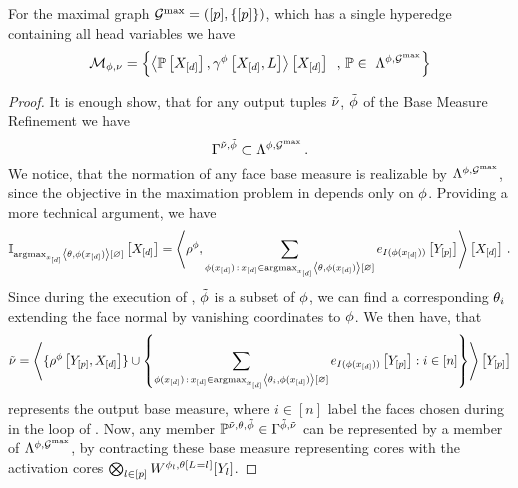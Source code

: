 \begin{theorem}
	For the maximal graph $\mathcal{G}^{\mathrm{max}}=([p],\{[p]\})$, which has a single hyperedge containing all head variables we have
	\begin{align*}
		\genmeanset = \left\{ \contractionof{\probat{\shortcatvariables},\sencodingofat{\sstat}{\shortcatvariables,\selvariable}}{\shortcatvariables} \, , \, \probtensor \in \realizabledistsof{\sstat,\maxgraph} \right\}
	\end{align*}
\end{theorem}
\begin{proof}
	It is enough show, that for any output tuples $\tilde{\nu}$, $\tilde{\phi}$ of the Base Measure Refinement  we have
		\[ \Gamma^{\tilde{\nu},\tilde{\phi}} \subset  \Lambda^{\phi,\mathcal{G}^{\mathrm{max}}} \, . \]
	We notice, that the normation of any face base measure is realizable by $\Lambda^{\phi,\mathcal{G}^{\mathrm{max}}}$, since the objective in the maximation problem in  depends only on $\phi$.
	Providing a more technical argument, we have
	\begin{align*}
		\mathbb{I}_{\mathrm{argmax}_{x_{[d]}} \left\langle \theta,\phi(x_{[d]})\right\rangle \left[ \varnothing \right]}\left[X_{[d]}\right]
		= \left\langle 
			\rho^{\phi},
			\sum_{\phi(x_{[d]}) \, : \, x_{[d]} \in \mathrm{argmax}_{x_{[d]}} \left\langle \theta,\phi(x_{[d]})\right\rangle \left[ \varnothing \right] }
			e_{I(\phi(x_{[d]}))}\left[Y_{[p]}\right]
		\right\rangle \left[ X_{[d]} \right] \, .
	\end{align*}
	Since during the execution of , $\tilde{\phi}$ is a subset of $\phi$, we can find a corresponding $\theta_{i}$ extending the face normal by vanishing coordinates to $\phi$.
	We then have, that 
	\begin{align*}
		\tilde{\nu} = \left\langle 
			\{\rho^{\phi}\left[Y_{[p]},X_{[d]}\right]\} \cup
			\left\{\sum_{\phi(x_{[d]}) \, : \, x_{[d]} \in \mathrm{argmax}_{x_{[d]}} \left\langle \theta_{i},\phi(x_{[d]})\right\rangle \left[ \varnothing \right] } 
			e_{I(\phi(x_{[d]}))}\left[Y_{[p]}\right]
			: i \in [n] \right\}
			\right\rangle \left[ Y_{[p]} \right] 
	\end{align*}
	represents the output base measure, where $i\in[n]$ label the faces chosen during in the loop of .
	Now, any member $\mathbb{P}^{\tilde{\nu},\theta,\tilde{\phi}}\in\Gamma^{\tilde{\phi},\tilde{\nu}}$ can be represented by a member of  $\Lambda^{\phi,\mathcal{G}^{\mathrm{max}}}$, by contracting these base measure representing cores with the activation cores $\bigotimes_{l\in[p]}W^{\phi_{l},\theta\left[L_{}=l_{}\right]}[Y_{l}]$.
\end{proof}

